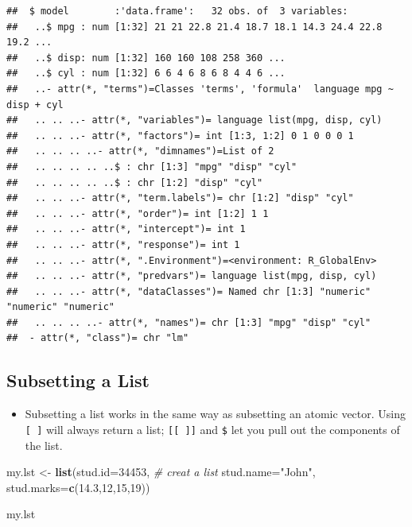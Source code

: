 \documentclass[]{book}
\newenvironment{Shaded}{\begin{snugshade}}{\end{snugshade}}
\newcommand{\CommentTok}[1]{\textcolor[rgb]{0.56,0.35,0.01}{\textit{#1}}}
\newcommand{\DataTypeTok}[1]{\textcolor[rgb]{0.13,0.29,0.53}{#1}}
\newcommand{\DecValTok}[1]{\textcolor[rgb]{0.00,0.00,0.81}{#1}}
\newcommand{\FloatTok}[1]{\textcolor[rgb]{0.00,0.00,0.81}{#1}}
\newcommand{\KeywordTok}[1]{\textcolor[rgb]{0.13,0.29,0.53}{\textbf{#1}}}
\newcommand{\NormalTok}[1]{#1}
\newcommand{\StringTok}[1]{\textcolor[rgb]{0.31,0.60,0.02}{#1}}
\providecommand{\tightlist}{%
  \setlength{\itemsep}{0pt}\setlength{\parskip}{0pt}}
\begin{document}
\begin{verbatim}
##  $ model        :'data.frame':   32 obs. of  3 variables:
##   ..$ mpg : num [1:32] 21 21 22.8 21.4 18.7 18.1 14.3 24.4 22.8 19.2 ...
##   ..$ disp: num [1:32] 160 160 108 258 360 ...
##   ..$ cyl : num [1:32] 6 6 4 6 8 6 8 4 4 6 ...
##   ..- attr(*, "terms")=Classes 'terms', 'formula'  language mpg ~ disp + cyl
##   .. .. ..- attr(*, "variables")= language list(mpg, disp, cyl)
##   .. .. ..- attr(*, "factors")= int [1:3, 1:2] 0 1 0 0 0 1
##   .. .. .. ..- attr(*, "dimnames")=List of 2
##   .. .. .. .. ..$ : chr [1:3] "mpg" "disp" "cyl"
##   .. .. .. .. ..$ : chr [1:2] "disp" "cyl"
##   .. .. ..- attr(*, "term.labels")= chr [1:2] "disp" "cyl"
##   .. .. ..- attr(*, "order")= int [1:2] 1 1
##   .. .. ..- attr(*, "intercept")= int 1
##   .. .. ..- attr(*, "response")= int 1
##   .. .. ..- attr(*, ".Environment")=<environment: R_GlobalEnv> 
##   .. .. ..- attr(*, "predvars")= language list(mpg, disp, cyl)
##   .. .. ..- attr(*, "dataClasses")= Named chr [1:3] "numeric" "numeric" "numeric"
##   .. .. .. ..- attr(*, "names")= chr [1:3] "mpg" "disp" "cyl"
##  - attr(*, "class")= chr "lm"
\end{verbatim}

\hypertarget{subsetting-a-list}{%
\subsection{Subsetting a List}\label{subsetting-a-list}}

\begin{itemize}
\tightlist
\item
  Subsetting a list works in the same way as subsetting an atomic vector. Using \texttt{{[}\ {]}} will always return a list; \texttt{{[}{[}\ {]}{]}} and \texttt{\$} let you pull out the components of the list.
\end{itemize}

\begin{Shaded}
\begin{Highlighting}[]
\NormalTok{my.lst <-}\StringTok{ }\KeywordTok{list}\NormalTok{(}\DataTypeTok{stud.id=}\DecValTok{34453}\NormalTok{,      }\CommentTok{# creat a list}
               \DataTypeTok{stud.name=}\StringTok{"John"}\NormalTok{, }
               \DataTypeTok{stud.marks=}\KeywordTok{c}\NormalTok{(}\FloatTok{14.3}\NormalTok{,}\DecValTok{12}\NormalTok{,}\DecValTok{15}\NormalTok{,}\DecValTok{19}\NormalTok{))}
\end{Highlighting}
\end{Shaded}

\begin{Shaded}
\begin{Highlighting}[]
\NormalTok{my.lst}
\end{Highlighting}
\end{Shaded}
\end{document}
